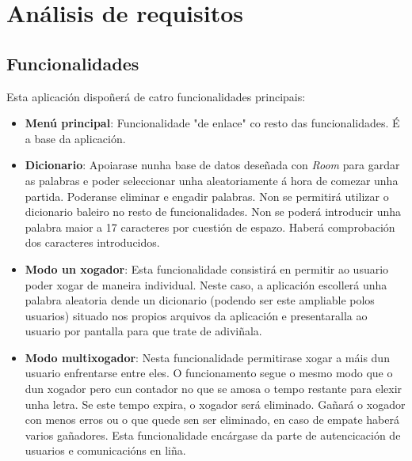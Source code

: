 \chapter{Análisis de requisitos}
\label{chap:requisitos}
\section{Funcionalidades}
Esta aplicación dispoñerá de catro funcionalidades principais:
\begin{itemize}

    \item \textbf{Menú principal}: Funcionalidade "de enlace" co resto das funcionalidades. É a base da aplicación.
    
    \item \textbf{Dicionario}: Apoiarase nunha base de datos deseñada con \textit{Room} para gardar as palabras e poder seleccionar unha aleatoriamente á hora de comezar unha partida. Poderanse eliminar e engadir palabras. Non se permitirá utilizar o dicionario baleiro no resto de funcionalidades. Non se poderá introducir unha palabra maior a 17 caracteres por cuestión de espazo. Haberá comprobación dos caracteres introducidos.
    
    \item \textbf{Modo un xogador}: Esta funcionalidade consistirá en permitir ao usuario poder xogar de maneira individual. Neste caso, a aplicación escollerá unha palabra aleatoria dende un dicionario (podendo ser este ampliable polos usuarios) situado nos propios arquivos da aplicación e presentaralla ao usuario por pantalla para que trate de adiviñala.
    
    
    \item \textbf{Modo multixogador}: Nesta funcionalidade permitirase xogar a máis dun usuario enfrentarse entre eles. O funcionamento segue o mesmo modo que o dun xogador pero cun contador no que se amosa o tempo restante para elexir unha letra. Se este tempo expira, o xogador será eliminado. Gañará o xogador con menos erros ou o que quede sen ser eliminado, en caso de empate haberá varios gañadores. Esta funcionalidade encárgase da parte de autencicación de usuarios e comunicacións en liña.
    
\end{itemize}

